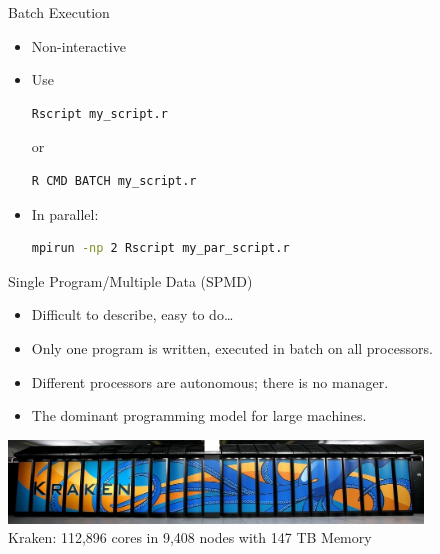 \begin{frame}[fragile]
  \begin{block}{Batch Execution}\pause
    \begin{itemize}
      \item Non-interactive
      \item Use
\vspace{-.4cm}
\begin{lstlisting}[language=sh]
Rscript my_script.r
\end{lstlisting}
or\vspace{-.4cm}
\begin{lstlisting}[language=sh]
R CMD BATCH my_script.r
\end{lstlisting}
      \item In parallel:
\vspace{-.4cm}
\begin{lstlisting}[language=sh]
mpirun -np 2 Rscript my_par_script.r
\end{lstlisting}
    \end{itemize}
  \end{block}
\end{frame}

\begin{frame}
  \begin{block}{Single Program/Multiple Data (SPMD)}\pause
    \begin{itemize}
      \item Difficult to describe, easy to do\dots
      \item Only one program is written, executed in batch on all processors.
      \item Different processors are autonomous; there is no manager.
      \item The dominant programming model for large machines.
    \end{itemize}
  \end{block}
  \begin{center}
    \includegraphics[width=11cm]{../common/pics/kraken1wide.jpg} \\
    Kraken: 112,896 cores in 9,408 nodes with 147 TB Memory
    \end{center}
\end{frame}

